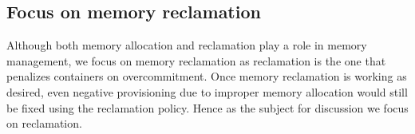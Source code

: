       \subsection{Focus on memory reclamation}
	Although both memory allocation and reclamation play a role in memory management, we focus on memory reclamation as reclamation is 
the one that penalizes containers on overcommitment. Once memory reclamation is working as desired, even negative provisioning due to 
improper memory allocation would still be fixed using the reclamation policy. Hence as the subject for discussion we focus on reclamation.
      
 